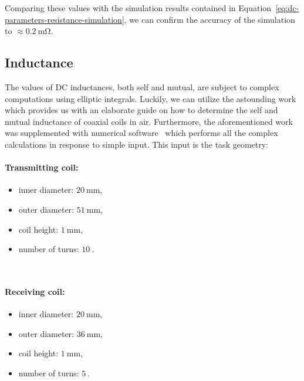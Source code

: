 \documentclass[11pt,a4paper,twoside,openany]{report}
\begin{document}
            Comparing these values with the simulation results contained in Equation~\ref{eq:dc-parameters-resistance-simulation}, we can confirm the accuracy of the simulation to $\approx\qty{0.2}{\mohm}$.
        
        \subsection{Inductance}
            
            The values of DC inductances, both self and mutual, are subject to complex computations using elliptic integrals. Luckily, we can utilize the astounding work~\cite{pankrac:power-inductors-part-3} which provides us with an elaborate guide on how to determine the self and mutual inductance of coaxial coils in air. Furthermore, the aforementioned work was supplemented with numerical software~\cite{pankrac-software:self-and-mutual-inductance-calculation-of-coaxial-coils-in-air} which performs all the complex calculations in response to simple input. This input is the task geometry:
            \begin{center}
                \begin{minipage}{.45\textwidth}
                    \paragraph{Transmitting coil:} \begin{itemize}
                        \item inner diameter: $\qty{20}{\mm}$,
                        \item outer diameter: $\qty{51}{\mm}$,
                        \item coil height: $\qty{1}{\mm}$,
                        \item number of turns: $\qty{10}{}$.
                    \end{itemize}
                \end{minipage}
                ~
                \begin{minipage}{.45\textwidth}
                    \paragraph{Receiving coil:} \begin{itemize}
                        \item inner diameter: $\qty{20}{\mm}$,
                        \item outer diameter: $\qty{36}{\mm}$,
                        \item coil height: $\qty{1}{\mm}$,
                        \item number of turns: $\qty{5}{}$.
                    \end{itemize}
                \end{minipage}
            \end{center}
\end{document}
